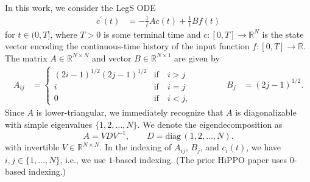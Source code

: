 \documentclass{article}
\theoremstyle{definition}
\newcommand{\pr}[1]{ \left( #1 \right) }
\newcommand{\derivative}[1]{#1^{\prime}}
\begin{document}
In this work, we consider the LegS ODE
\begin{align}   \label{eq:legs} %
    \derivative{c}(t) &= -\frac{1}{t}Ac(t) + \frac{1}{t}Bf(t) 
\end{align}
for $t\in (0,T]$, where $T>0$ is some terminal time and $c\colon [0,T]\rightarrow  \mathbb{R}^N$ is the state vector encoding the continuous-time history of the input function $f \colon  [0,T] \to \mathbb{R}$. The matrix $A \in \mathbb R^{N \times N}$ and vector $B \in \mathbb R^{N \times 1}$ are given by
\[
    \begin{aligned}
    A_{ij} &= \begin{cases}
        (2i-1)^{1/2}(2j-1)^{1/2} & \text{if} \quad i > j \\
        i & \text{if} \quad i=j \\
        0 & \text{if} \quad i < j ,
    \end{cases} \qquad\qquad
    B_j &= (2j-1)^{1/2}.
\end{aligned}
\]
Since $A$ is lower-triangular, we immediately recognize that $A$ is diagonalizable with simple eigenvalues $\{1, 2, \dots, N\}$. We denote the eigendecomposition as
\[
A=V DV^{-1},\qquad 
    D = \mathrm{diag}\,(1,2,\dots,N).
\]
with invertible $V\in\mathbb{R}^{N\times N}$.
In the indexing of $A_{ij}$, $B_j$, and $c_i(t)$, we have $i,j\in\{1,\dots,N\}$, i.e., we use $1$-based indexing. (The prior HiPPO paper \citep{gu2020hippo} uses $0$-based indexing.)







\end{document}
